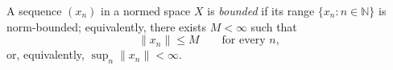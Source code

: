 
A sequence $(x_n)$ in a normed space $X$ is \emph{bounded} if its range $\{x_n:n\in\mathbb N\}$ is norm-bounded; equivalently, there exists $M<\infty$ such that
\[
\|x_n\|\le M\qquad\text{for every }n,
\]
or, equivalently, $\sup_n\|x_n\|<\infty$.
